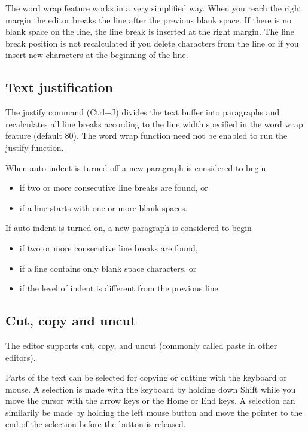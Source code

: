 \documentclass{article}
\begin{document}
        The word wrap feature works in a very simplified way. When you reach the right margin the editor breaks the
        line after the previous blank space. If there is no blank space on the line, the line break is inserted
        at the right margin. The line break position is not recalculated if you delete characters from the line
        or if you insert new characters at the beginning of the line.

    \subsection{Text justification}
        The justify command (Ctrl+J) divides the text buffer into paragraphs and recalculates all line breaks
        according to the line width specified in the word wrap feature (default 80). The word wrap function 
        need not be enabled to run the justify function.
          
        When auto-indent is turned off a new paragraph is considered to begin

        \begin{itemize}
            \item if two or more consecutive line breaks are found, or
            \item if a line starts with one or more blank spaces.
        \end{itemize}

        If auto-indent is turned on, a new paragraph is considered to begin

        \begin{itemize}
            \item if two or more consecutive line breaks are found, 
            \item if a line contains only blank space characters, or
            \item if the level of indent is different from the previous line.
        \end{itemize}

    \subsection{Cut, copy and uncut}
        The editor supports cut, copy, and uncut (commonly called paste in other editors).

        Parts of the text can be selected for copying or cutting with the keyboard or mouse.
        A selection is made with the keyboard by holding down Shift while you move the cursor
        with the arrow keys or the Home or End keys. A selection can similarily be made by
        holding the left mouse button and move the pointer to the end of the selection before
        the button is released.
\end{document}
